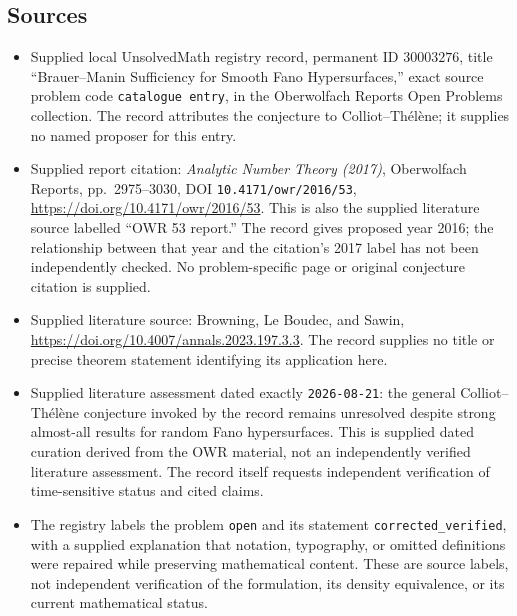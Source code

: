 \documentclass[11pt]{article}
\begin{document}
\subsection{Sources}
\begin{itemize}
\item Supplied local UnsolvedMath registry record, permanent ID \(30003276\), title ``Brauer--Manin Sufficiency for Smooth Fano Hypersurfaces,'' exact source problem code \texttt{catalogue entry}, in the Oberwolfach Reports Open Problems collection. The record attributes the conjecture to Colliot--Th\'el\`ene; it supplies no named proposer for this entry.
\item Supplied report citation: \emph{Analytic Number Theory (2017)}, Oberwolfach Reports, pp.\ 2975--3030, DOI \texttt{10.4171/owr/2016/53}, \url{https://doi.org/10.4171/owr/2016/53}. This is also the supplied literature source labelled ``OWR 53 report.'' The record gives proposed year 2016; the relationship between that year and the citation's 2017 label has not been independently checked. No problem-specific page or original conjecture citation is supplied.
\item Supplied literature source: Browning, Le Boudec, and Sawin, \url{https://doi.org/10.4007/annals.2023.197.3.3}. The record supplies no title or precise theorem statement identifying its application here.
\item Supplied literature assessment dated exactly \texttt{2026-08-21}: the general Colliot--Th\'el\`ene conjecture invoked by the record remains unresolved despite strong almost-all results for random Fano hypersurfaces. This is supplied dated curation derived from the OWR material, not an independently verified literature assessment. The record itself requests independent verification of time-sensitive status and cited claims.
\item The registry labels the problem \texttt{open} and its statement \texttt{corrected\_verified}, with a supplied explanation that notation, typography, or omitted definitions were repaired while preserving mathematical content. These are source labels, not independent verification of the formulation, its density equivalence, or its current mathematical status.
\end{itemize}
\end{document}
